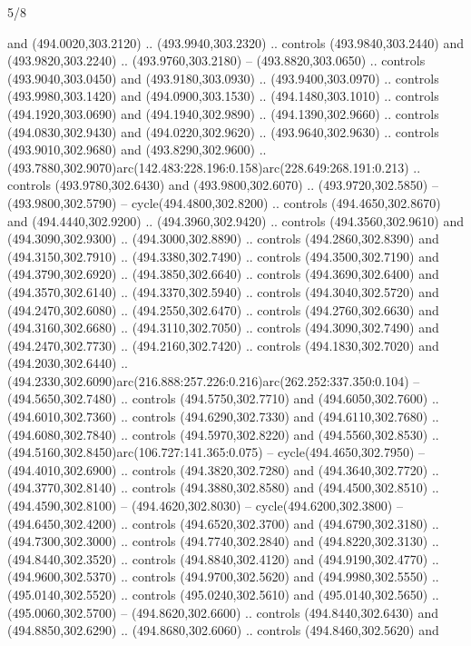 \begin{flagdescription}{5/8}
\begin{scope}[xshift=0.5\flaglength,yshift=0.5\flagwidth,scale=\flagwidth/475.63]
\begin{scope}[y=0.8pt, x=0.8pt, yscale=-1, xscale=1,shift={(-450,-300)}]
\begin{scope}[cm={{1.0,0.0,0.0,1.0,(-0.0002,0.12556)}},cm={{1.0,0.0,0.0,1.0,(0.00179,0.0)}}]
\begin{scope}[cm={{1.11592,0.0,0.0,1.11592,(-106.89933,-41.77764)}}]
\begin{scope}[draw=black,fill=cfff]
\begin{scope}[fill=black]
  and (494.0020,303.2120) .. (493.9940,303.2320) .. controls (493.9840,303.2440)
  and (493.9820,303.2240) .. (493.9760,303.2180) -- (493.8820,303.0650) ..
  controls (493.9040,303.0450) and (493.9180,303.0930) .. (493.9400,303.0970) ..
  controls (493.9980,303.1420) and (494.0900,303.1530) .. (494.1480,303.1010) ..
  controls (494.1920,303.0690) and (494.1940,302.9890) .. (494.1390,302.9660) ..
  controls (494.0830,302.9430) and (494.0220,302.9620) .. (493.9640,302.9630) ..
  controls (493.9010,302.9680) and (493.8290,302.9600) ..
  (493.7880,302.9070)arc(142.483:228.196:0.158)arc(228.649:268.191:0.213) ..
  controls (493.9780,302.6430) and (493.9800,302.6070) .. (493.9720,302.5850) --
  (493.9800,302.5790) -- cycle(494.4800,302.8200) .. controls
  (494.4650,302.8670) and (494.4440,302.9200) .. (494.3960,302.9420) .. controls
  (494.3560,302.9610) and (494.3090,302.9300) .. (494.3000,302.8890) .. controls
  (494.2860,302.8390) and (494.3150,302.7910) .. (494.3380,302.7490) .. controls
  (494.3500,302.7190) and (494.3790,302.6920) .. (494.3850,302.6640) .. controls
  (494.3690,302.6400) and (494.3570,302.6140) .. (494.3370,302.5940) .. controls
  (494.3040,302.5720) and (494.2470,302.6080) .. (494.2550,302.6470) .. controls
  (494.2760,302.6630) and (494.3160,302.6680) .. (494.3110,302.7050) .. controls
  (494.3090,302.7490) and (494.2470,302.7730) .. (494.2160,302.7420) .. controls
  (494.1830,302.7020) and (494.2030,302.6440) ..
  (494.2330,302.6090)arc(216.888:257.226:0.216)arc(262.252:337.350:0.104) --
  (494.5650,302.7480) .. controls (494.5750,302.7710) and (494.6050,302.7600) ..
  (494.6010,302.7360) .. controls (494.6290,302.7330) and (494.6110,302.7680) ..
  (494.6080,302.7840) .. controls (494.5970,302.8220) and (494.5560,302.8530) ..
  (494.5160,302.8450)arc(106.727:141.365:0.075) -- cycle(494.4650,302.7950) --
  (494.4010,302.6900) .. controls (494.3820,302.7280) and (494.3640,302.7720) ..
  (494.3770,302.8140) .. controls (494.3880,302.8580) and (494.4500,302.8510) ..
  (494.4590,302.8100) -- (494.4620,302.8030) -- cycle(494.6200,302.3800) --
  (494.6450,302.4200) .. controls (494.6520,302.3700) and (494.6790,302.3180) ..
  (494.7300,302.3000) .. controls (494.7740,302.2840) and (494.8220,302.3130) ..
  (494.8440,302.3520) .. controls (494.8840,302.4120) and (494.9190,302.4770) ..
  (494.9600,302.5370) .. controls (494.9700,302.5620) and (494.9980,302.5550) ..
  (495.0140,302.5520) .. controls (495.0240,302.5610) and (495.0140,302.5650) ..
  (495.0060,302.5700) -- (494.8620,302.6600) .. controls (494.8440,302.6430) and
  (494.8850,302.6290) .. (494.8680,302.6060) .. controls (494.8460,302.5620) and

\end{scope}
\end{scope}
\end{scope}
\end{scope}
\end{scope}
\end{scope}
\end{flagdescription}
